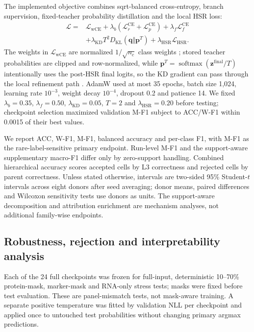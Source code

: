 \documentclass[unnumsec,webpdf,contemporary,large,numbered]{oup-authoring-template}
\begin{document}
The implemented objective combines sqrt-balanced cross-entropy, branch supervision, fixed-teacher probability distillation and the local HSR loss:
\begin{equation}
\begin{aligned}
\mathcal{L}={}&\mathcal{L}_{\mathrm{wCE}}+
\lambda_b(\mathcal{L}^{\mathrm{CE}}_{r}+\mathcal{L}^{\mathrm{CE}}_{p})+
\lambda_f\mathcal{L}^{\mathrm{CE}}_{f}\\
&+\lambda_{\mathrm{KD}}T^2D_{\mathrm{KL}}(\mathbf{q}\Vert\mathbf{p}^{T})+
\lambda_{\mathrm{HSR}}\mathcal{L}_{\mathrm{HSR}}.
\end{aligned}
\end{equation}
The weights in $\mathcal{L}_{\mathrm{wCE}}$ are normalized $1/\sqrt{n_c}$ class weights \citep{buda2018imbalance}; stored teacher probabilities are clipped and row-normalized, while $\mathbf{p}^{T}=\operatorname{softmax}(\mathbf{z}^{\mathrm{final}}/T)$ intentionally uses the post-HSR final logits, so the KD gradient can pass through the local refinement path \citep{hinton2015distilling}. AdamW used at most 35 epochs, batch size 1,024, learning rate $10^{-3}$, weight decay $10^{-4}$, dropout 0.2 and patience 14. We fixed $\lambda_b=0.35$, $\lambda_f=0.50$, $\lambda_{\mathrm{KD}}=0.05$, $T=2$ and $\lambda_{\mathrm{HSR}}=0.20$ before testing; checkpoint selection maximized validation M-F1 subject to ACC/W-F1 within 0.0015 of their best values.

We report ACC, W-F1, M-F1, balanced accuracy and per-class F1, with M-F1 as the rare-label-sensitive primary endpoint. Run-level M-F1 and the support-aware supplementary macro-F1 differ only by zero-support handling. Combined hierarchical accuracy scores accepted cells by L3 correctness and rejected cells by parent correctness. Unless stated otherwise, intervals are two-sided 95\% Student-$t$ intervals across eight donors after seed averaging; donor means, paired differences and Wilcoxon sensitivity tests use donors as units. The support-aware decomposition and attribution enrichment are mechanism analyses, not additional family-wise endpoints.

\subsection{Robustness, rejection and interpretability analysis}

Each of the 24 full checkpoints was frozen for full-input, deterministic 10--70\% protein-mask, marker-mask and RNA-only stress tests; masks were fixed before test evaluation. These are panel-mismatch tests, not mask-aware training. A separate positive temperature was fitted by validation NLL per checkpoint and applied once to untouched test probabilities without changing primary argmax predictions.
\end{document}

